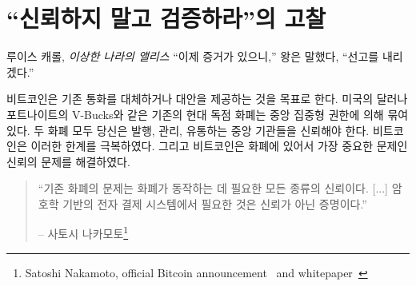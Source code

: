 \chapter{ \enquote{신뢰하지 말고 검증하라}의 고찰}
\label{les:16}

\begin{comment}
\begin{chapquote}{Lewis Carroll, \textit{Alice in Wonderland}}
\enquote{Now for the evidence,} said the King, \enquote{and then the sentence.}
\end{chapquote}
\end{comment}
\begin{chapquote}{루이스 캐롤, \textit{이상한 나라의 앨리스}}
	\enquote{이제 증거가 있으니,} 왕은 말했다, \enquote{선고를 내리겠다.}
\end{chapquote}

\begin{comment}
Bitcoin aims to replace, or at least provide an alternative to,
conventional currency. Conventional currency is bound to a centralized
authority, no matter if we are talking about legal tender like the US
dollar or modern monopoly money like Fortnite's V-Bucks. In both
examples, you are bound to trust the central authority to issue, manage
and circulate your money. Bitcoin unties this bound, and the main issue
Bitcoin solves is the issue of \textit{trust}.
\end{comment}
비트코인은 기존 통화를 대체하거나 대안을 제공하는 것을 목표로 한다.
미국의 달러나 포트나이트의 V-Bucks와 같은 기존의 현대 독점 화폐는 
중앙 집중형 권한에 의해 묶여있다.
두 화폐 모두 당신은 발행, 관리, 유통하는 중앙 기관들을 신뢰해야 한다.
비트코인은 이러한 한계를 극복하였다.
그리고 비트코인은 화폐에 있어서 가장 중요한 문제인 신뢰의 문제를 해결하였다.



\begin{quotation}\begin{samepage}
		\enquote{기존 화폐의 문제는 화폐가 동작하는 데 필요한 모든 종류의 신뢰이다. [...] 
		암호학 기반의 전자 결제 시스템에서 필요한 것은 신뢰가 아닌 증명이다.}
		\begin{flushright} -- 사토시 나카모토\footnote{Satoshi Nakamoto, official Bitcoin announcement~\cite{bitcoin-announcement} and whitepaper~\cite{whitepaper}}
\end{flushright}\end{samepage}\end{quotation}

